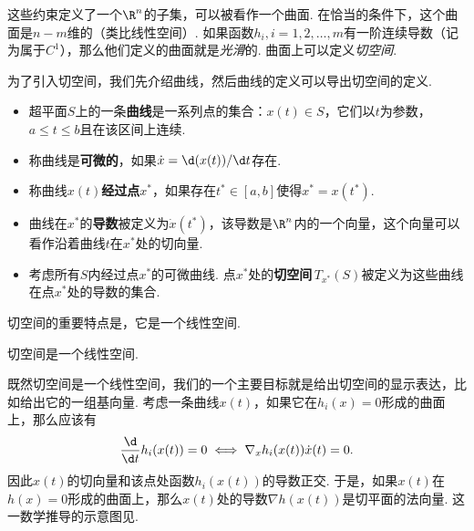 这些约束定义了一个$\R^n$的子集，可以被看作一个曲面. 在恰当的条件下，这个曲面是$n-m$维的（类比线性空间）. 如果函数$h_i,i=1,2,\dots,m$有一阶连续导数（记为属于$C^1$），那么他们定义的曲面就是\emph{光滑}的. 曲面上可以定义\emph{切空间}.
    
为了引入切空间，我们先介绍曲线，然后曲线的定义可以导出切空间的定义. 
\begin{definition}[曲线与切空间]
\begin{itemize}
    \item 超平面$S$上的一条\textbf{曲线}是一系列点的集合：${x}(t)\in S$，它们以$t$为参数，$a\le t\le b$且在该区间上连续. 
    \item 称曲线是\textbf{可微的}，如果$\dot{{x}}=\d({x}(t))/\d t$存在. 
    \item 称曲线${x}(t)$\textbf{经过点${x^\ast}$}，如果存在$t^\ast\in[a,b]$使得${x^\ast}={x}(t^\ast)$. 
    \item 曲线在${x^\ast}$的\textbf{导数}被定义为$\dot{{x}}(t^\ast)$，该导数是$\R^n$内的一个向量，这个向量可以看作沿着曲线$t$在$x^\ast$处的切向量.
    \item 考虑所有$S$内经过点${x^\ast}$的可微曲线. 点${x^\ast}$处的\textbf{切空间}\,$T_{x^\ast}(S)$被定义为这些曲线在点${x^\ast}$处的导数的集合. 
\end{itemize}
\end{definition}

切空间的重要特点是，它是一个线性空间.
\begin{lemma}\label{lemma:tan-space}
    切空间是一个线性空间. 
\end{lemma}

既然切空间是一个线性空间，我们的一个主要目标就是给出切空间的显示表达，比如给出它的一组基向量. 考虑一条曲线$x(t)$，如果它在$h_i(x)=0$形成的曲面上，那么应该有
    \[\frac{\d}{\d t}h_i(x(t))=0\iff \nabla_x h_i(x(t))\dot{x}(t)=0.\]
因此${x}(t)$的切向量和该点处函数$h_i({x}(t))$的导数正交. 于是，如果$x(t)$在$h(x)=0$形成的曲面上，那么${x}(t)$处的导数$\nabla h(x(t))$是切平面的法向量. 这一数学推导的示意图见.

